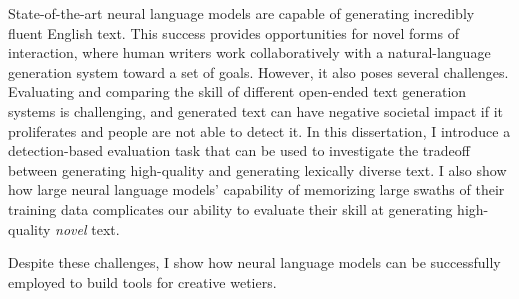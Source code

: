 \begin{center}
{\Large \mytitle}

\vspace{2cm}

{\Large{}}
\end{center}

State-of-the-art neural language models are capable of generating incredibly fluent English text.
This success provides opportunities for novel forms of interaction, where human writers work collaboratively with a natural-language generation system toward a set of goals.
However, it also poses several challenges.
Evaluating and comparing the skill of different open-ended text generation systems is challenging, and generated text can have negative societal impact if it proliferates and people are not able to detect it.
In this dissertation, I introduce a detection-based evaluation task that can be used to investigate the tradeoff between generating high-quality and generating lexically diverse text.
I also show how large neural language models' capability of memorizing large swaths of their training data complicates our ability to evaluate their skill at generating high-quality \textit{novel} text.

Despite these challenges, I show how neural language models can be successfully employed to build tools for creative wetiers. 
